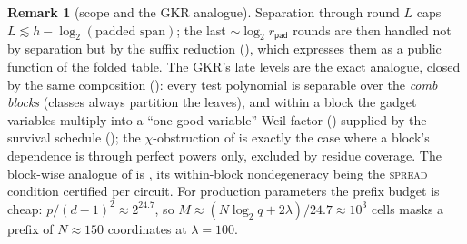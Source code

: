 \documentclass{article}
\theoremstyle{definition}
\newtheorem{remark}[theorem]{Remark}
\begin{document}
\begin{remark}[scope and the GKR analogue]\label{rem:prefix-scope}
Separation through round $L$ caps $L \lesssim h - \log_2(\text{padded span})$; the last $\sim \log_2 r_{\mathsf{pad}}$ rounds are then handled not by separation but by the suffix reduction (), which expresses them as a public function of the folded table. The GKR's late levels are the exact analogue, closed by the same composition (): every test polynomial is separable over the \emph{comb blocks} (classes always partition the leaves), and within a block the gadget variables multiply into a ``one good variable'' Weil factor () supplied by the survival schedule (); the $\chi$-obstruction of  is exactly the case where a block's dependence is through perfect powers only, excluded by residue coverage. The block-wise analogue of  is , its within-block nondegeneracy being the \textsc{spread} condition certified per circuit. For production parameters the prefix budget is cheap: $p/(d-1)^2 \approx 2^{24.7}$, so $M \approx (N \log_2 q + 2\lambda)/24.7 \approx 10^3$ cells masks a prefix of $N \approx 150$ coordinates at $\lambda = 100$.
\end{remark}
\end{document}
